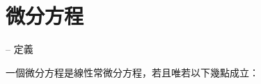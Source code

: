 \documentclass[standalone]{beamer}
\begin{document}
\section{微分方程}

\begin{frame}{{\secname} -- 定義}
  \begin{definition}
    一個微分方程是線性常微分方程，若且唯若以下幾點成立：
    \vspace{2cm}
  \end{definition}
\end{frame}
\end{document}
